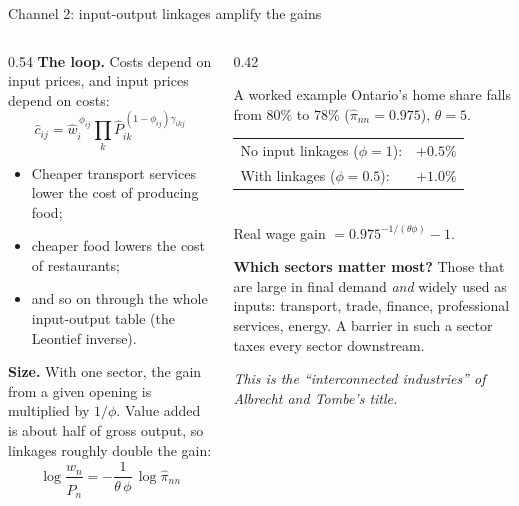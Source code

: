 \documentclass[aspectratio=169,9pt,t]{beamer}
\newcommand{\h}[1]{\hat{#1}}
\newcommand{\plain}[1]{{\color{ipgrey}\small\itshape #1}}
\begin{document}
\begin{frame}{Channel 2: input-output linkages amplify the gains}
  \begin{columns}[T]
    \begin{column}{0.54\textwidth}
      \textbf{The loop.} Costs depend on input prices, and input prices
      depend on costs:
      \[ \h c_{ij}=\h w_i^{\,\phi_{ij}}\prod_k\h P_{ik}^{\,(1-\phi_{ij})\gamma_{ikj}} \]
      \begin{itemize}
        \item Cheaper transport services lower the cost of producing food;
        \item cheaper food lowers the cost of restaurants;
        \item and so on through the whole input-output table (the
              Leontief inverse).
      \end{itemize}
      \textbf{Size.} With one sector, the gain from a given opening is
      multiplied by $1/\phi$. Value added is about half of gross output,
      so linkages roughly \alert{double} the gain:
      \[ \log\frac{\h w_n}{\h P_n}=-\frac{1}{\theta\,\phi}\,\log\h\pi_{nn} \]
    \end{column}
    \begin{column}{0.42\textwidth}
      \begin{block}{A worked example}
        \small
        Ontario's home share falls from 80\% to 78\%
        ($\h\pi_{nn}=0.975$), $\theta=5$.\\[0.4em]
        \begin{tabular}{@{}lr@{}}
          No input linkages ($\phi=1$): & $+0.5\%$\\
          With linkages ($\phi=0.5$): & $+1.0\%$\\
        \end{tabular}\\[0.4em]
        Real wage gain $=0.975^{-1/(\theta\phi)}-1$.
      \end{block}
      \small
      \textbf{Which sectors matter most?} Those that are large in final
      demand \emph{and} widely used as inputs: transport, trade,
      finance, professional services, energy. A barrier in such a
      sector taxes every sector downstream.

      \smallskip
      \plain{This is the ``interconnected industries'' of Albrecht and
      Tombe's title.}
    \end{column}
  \end{columns}
\end{frame}
\end{document}
